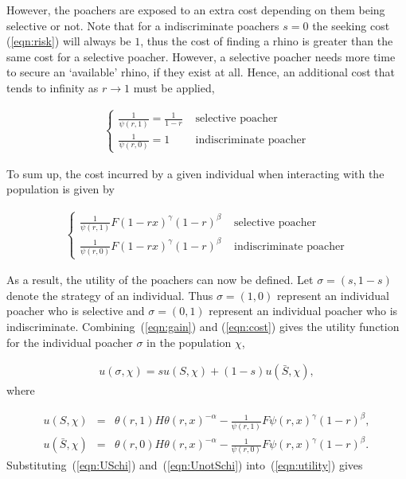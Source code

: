 \documentclass[10pt]{article}
\begin{document}
However, the poachers are exposed to an extra cost depending on them being
selective or not. Note that for a indiscriminate poachers \(s = 0\) the seeking 
cost (\ref{eqn:risk}) will always be \(1\), thus the cost of finding a rhino is greater
than the same cost for a selective poacher. However, a selective poacher needs 
more time to secure an `available' rhino, if they exist at all. Hence, an 
additional cost that tends to infinity as \(r \rightarrow 1\) must be applied, 

\begin{eqnarray}
	\label{eqn:selective_cost}
	\left\{
	\begin{array}{cl}
	\frac{1}{\psi(r, 1)} = \frac{1}{1 - r} & \mbox{ selective poacher}
	\\
	\frac{1}{\psi(r, 0)} = 1 & \mbox{ indiscriminate poacher}
	\end{array} \right.
\end{eqnarray}

To sum up, the cost incurred by a given individual when interacting with
the population is given by 

\begin{eqnarray}
\label{eqn:cost}
\left\{
\begin{array}{cl}
\frac{1}{\psi(r,1)}  F(1- rx)^{\gamma} (1-r)^{\beta}& \mbox{ selective poacher}
\\
\frac{1}{\psi(r,0)} F(1 - rx)^{\gamma} (1-r)^{\beta}& \mbox{ indiscriminate poacher}
\end{array} \right.
\end{eqnarray}

As a result, the utility of the poachers can now be defined. Let \(\sigma = (s, 1 - s)\)
denote the strategy of an individual. Thus \(\sigma = (1, 0)\) represent an
individual poacher who is selective and \(\sigma = (0, 1)\) represent an individual
poacher who is indiscriminate. Combining~(\ref{eqn:gain}) and (\ref{eqn:cost})
gives the utility function for the individual poacher \(\sigma\) in the population
\(\chi\),

\begin{eqnarray}
\label{eqn:utility}
u(\sigma, \chi) = s u(S,\chi) +(1-s) u(\bar{S},\chi),
\end{eqnarray}
where

\begin{eqnarray}
\label{eqn:USchi}
u(S,\chi) &=& \theta(r,1) H \theta(r,x)^{-\alpha}
- \frac{1}{\psi(r,1)} F\psi(r, x)^{\gamma} (1-r)^{\beta} ,
\\
\label{eqn:UnotSchi}
u(\bar{S},\chi) &=& \theta(r,0) H \theta(r,x)^{-\alpha}
- \frac{1}{\psi(r,0)} F\psi(r, x)^{\gamma}  (1-r)^{\beta}.
\end{eqnarray}
Substituting~(\ref{eqn:USchi}) and~(\ref{eqn:UnotSchi}) into~(\ref{eqn:utility}) gives
\end{document}
